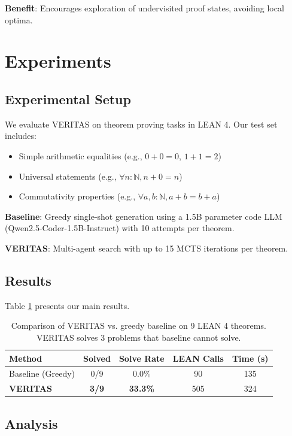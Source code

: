 \documentclass[11pt]{article}
\begin{document}
\textbf{Benefit}: Encourages exploration of undervisited proof states, avoiding local optima.

\section{Experiments}

\subsection{Experimental Setup}

We evaluate VERITAS on theorem proving tasks in LEAN 4. Our test set includes:
\begin{itemize}
    \item Simple arithmetic equalities (e.g., $0 + 0 = 0$, $1 + 1 = 2$)
    \item Universal statements (e.g., $\forall n : \mathbb{N}, n + 0 = n$)
    \item Commutativity properties (e.g., $\forall a, b : \mathbb{N}, a + b = b + a$)
\end{itemize}

\textbf{Baseline}: Greedy single-shot generation using a 1.5B parameter code LLM (Qwen2.5-Coder-1.5B-Instruct) with 10 attempts per theorem.

\textbf{VERITAS}: Multi-agent search with up to 15 MCTS iterations per theorem.

\subsection{Results}

Table \ref{tab:results} presents our main results.

\begin{table}[h]
\centering
\begin{tabular}{lcccc}
\toprule
\textbf{Method} & \textbf{Solved} & \textbf{Solve Rate} & \textbf{LEAN Calls} & \textbf{Time (s)} \\
\midrule
Baseline (Greedy) & 0/9 & 0.0\% & 90 & 135 \\
\textbf{VERITAS} & \textbf{3/9} & \textbf{33.3\%} & 505 & 324 \\
\bottomrule
\end{tabular}
\caption{Comparison of VERITAS vs. greedy baseline on 9 LEAN 4 theorems. VERITAS solves 3 problems that baseline cannot solve.}
\label{tab:results}
\end{table}

\subsection{Analysis}
\end{document}
